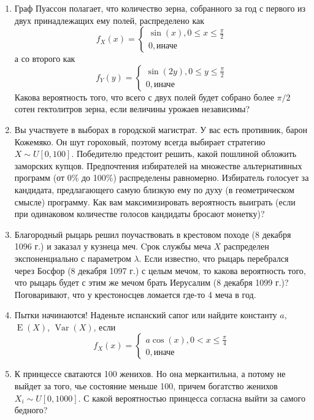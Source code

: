 \documentclass[a4paper,12pt]{article}
\DeclareMathOperator{\Var}{Var}
\DeclareMathOperator{\E}{E}
\begin{document}
\begin{enumerate} %
\item
Граф Пуассон полагает, что количество зерна, собранного за год с первого из двух принадлежащих ему полей, распределено как
    \[
    f_X(x)=
    \begin{cases}
    \sin(x), 0 \leq x \leq \frac{\pi}{2} \\
    0, \text{иначе}
    \end{cases}\]
   а со второго как
   \[
   f_Y(y)=
   \begin{cases}
   \sin(2y), 0 \leq y \leq \frac{\pi}{2} \\
    0, \text{иначе}
    \end{cases}
    \]
    Какова вероятность того, что всего с двух полей будет собрано более $\pi/2$ сотен гектолитров зерна, если величины урожаев независимы?
\item
Вы участвуете в выборах в городской магистрат. У вас есть противник, барон Кожемяко. Он шут гороховый, поэтому всегда выбирает стратегию $X \sim U[0,100] $. Победителю предстоит решить, какой пошлиной обложить заморских купцов. Предпочтения избирателей на множестве альтернативных программ (от 0\% до 100\%) распределены равномерно. Избиратель голосует за кандидата, предлагающего самую близкую ему по духу (в геометрическом смысле) программу. Как вам максимизировать вероятность выиграть (если при одинаковом количестве голосов кандидаты бросают монетку)?
\item
Благородный рыцарь решил поучаствовать в крестовом походе (8 декабря 1096 г.) и заказал у кузнеца меч. Cрок службы меча $X$ распределен экспоненциально с параметром $\lambda$. Если известно, что рыцарь перебрался через Босфор (8 декабря 1097 г.) с целым мечом, то какова вероятность того, что рыцарь будет с этим же мечом брать Иерусалим (8 декабря 1099 г.)? Поговаривают, что у крестоносцев ломается где-то 4 меча в год.
\item
Пытки начинаются! Наденьте испанский сапог или найдите константу $a$, $\E(X)$, $\Var(X)$, если
    \[
    f_X(x)=
    \begin{cases}
    a\cos(x), 0 < x \leq \frac{\pi}{4} \\
    0, \text{иначе}
    \end{cases}
    \]
\item
К принцессе сватаются 100 женихов. Но она меркантильна, а потому не выйдет за того, чье состояние меньше 100, причем богатство женихов $X_i \sim U[0,1000]$. С какой вероятностью принцесса согласна выйти за самого бедного?
\end{enumerate}
\end{document}
